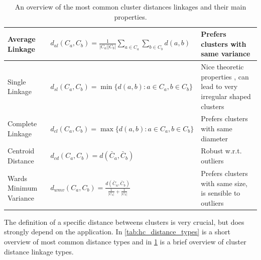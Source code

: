 \begin{table}
\begin{scriptsize}
\begin{tabular}{ |l|l|p{5cm}|}
    \hline
    Average Linkage \citep{sokal_1958_science_bulletin}           
        & $d_{al}(C_a,C_b) = \frac{1}{|C_a||C_b|} \sum _{a \in C_a} \sum_{b \in C_b} d(a,b) $ 
        & \scriptsize Prefers clusters with same variance \cite{sokal_1958_science_bulletin} \\ \hline

    Single Linkage \citep{florek_1951}            
        & $d_{sl}(C_a,C_b) =  \min\{d(a,b) : a \in C_a, b \in C_b\}$ 
        & Nice theoretic properties \citep{hartigan_1981_jjamstat,milligan_1980_psycho}, can lead
          to very irregular shaped clusters \\ \hline
    Complete Linkage \citep{sorensen_1948}         
        & $d_{cl}(C_a,C_b) =  \max\{d(a,b) : a \in C_a, b \in C_b\}$ 
        & Prefers clusters with same diameter \citep{milligan_1980_psycho} \\ \hline
    Centroid Distance         
        & $d_{cd}(C_a,C_b) =  d(\bar{C}_a,\bar{C}_b) $ 
        & Robust w.r.t. outliers \citep{milligan_1980_psycho} \\ \hline
    Wards Minimum Variance \citep{ward_63_jasa}
        & $d_{wmv}(C_a,C_b) = \frac{ d(\bar{C}_a,\bar{C}_b)}{ \frac{1}{|C_a|} + \frac{1}{|C_b|} } $ 
        & Prefers clusters with same size, is sensible to outliers \citep{milligan_1980_psycho} \\ \hline
\end{tabular}

\end{scriptsize}

\caption{
    An overview of the most common cluster distances linkages and their main properties.
}\label{tab:hc_linkage_types}
\end{table}


The definition of a specific distance betweens clusters is very crucial, 
but does strongly depend on the application.
In \cref{tab:hc_distance_types} is a short overview of most common distance
types and in   \cref{tab:hc_linkage_types} is a  brief overview 
of cluster distance linkage types.








